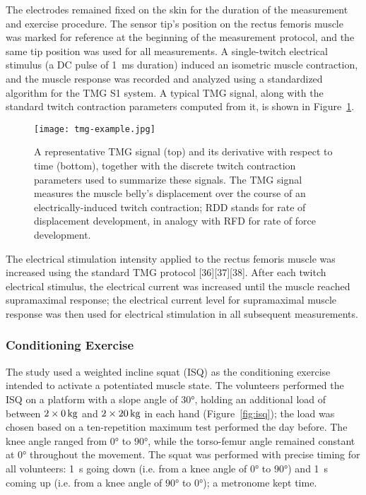 \documentclass[utf8]{style/FrontiersinHarvard}
\begin{document}
The electrodes remained fixed on the skin for the duration of the measurement and exercise procedure.
The sensor tip's position on the rectus femoris muscle was marked for reference at the beginning of the measurement protocol, and the same tip position was used for all measurements.
A single-twitch electrical stimulus (a DC pulse of \SI{1}{\milli \second} duration) induced an isometric muscle contraction,
and the muscle response was recorded and analyzed using a standardized algorithm for the TMG S1 system.
A typical TMG signal, along with the standard twitch contraction parameters computed from it, is shown in Figure~\ref{fig:tmg_example}.

\begin{figure}
	\centering
    \texttt{[image: tmg-example.jpg]}
    \caption{A representative TMG signal (top) and its derivative with respect to time (bottom), together with the discrete twitch contraction parameters used to summarize these signals.
    The TMG signal measures the muscle belly's displacement over the course of an electrically-induced twitch contraction;
    RDD stands for rate of displacement development, in analogy with RFD for rate of force development.}
    \label{fig:tmg_example}
\end{figure}

The electrical stimulation intensity applied to the rectus femoris muscle was increased using the standard TMG protocol [36][37][38].
After each twitch electrical stimulus, the electrical current was increased until the muscle reached supramaximal response;
the electrical current level for supramaximal muscle response was then used for electrical stimulation in all subsequent measurements.

\subsubsection{Conditioning Exercise}
The study used a weighted incline squat (ISQ) as the conditioning exercise intended to activate a potentiated muscle state. 
The volunteers performed the ISQ on a platform with a slope angle of $ \ang{30} $, holding an additional load of between $ \SI[parse-numbers = false, mode = match]{2 \times 0}{\kilogram} $ and $ \SI[parse-numbers = false, mode = match]{2 \times 20}{\kilogram} $ in each hand (Figure~\ref{fig:isq});
the load was chosen based on a ten-repetition maximum test performed the day before.
The knee angle ranged from $ \ang{0} $ to $ \ang{90} $, while the torso-femur angle remained constant at $ \ang{0} $ throughout the movement.
The squat was performed with precise timing for all volunteers: \SI{1}{\second} going down (i.e. from a knee angle of $ \ang{0} $ to $ \ang{90} $) and \SI{1}{\second} coming up (i.e. from a knee angle of $ \ang{90} $ to $ \ang{0} $); a metronome kept time.
\end{document}
